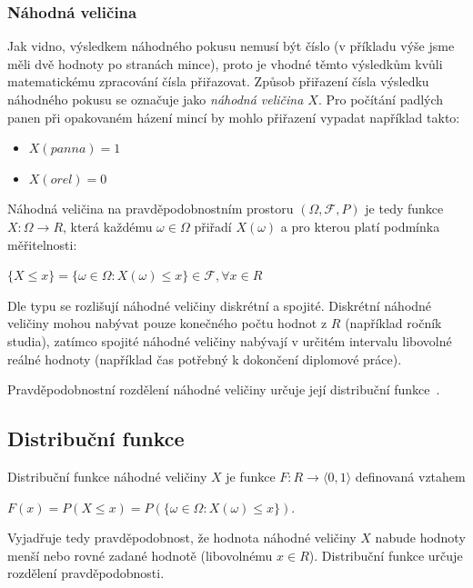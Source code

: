 \documentclass[thesis=M,czech]{FITthesis}[2014/05/07]
\begin{document}
\subsubsection{Náhodná veličina}
Jak vidno, výsledkem náhodného pokusu nemusí být číslo (v příkladu výše jsme měli dvě hodnoty po stranách mince), proto je vhodné těmto výsledkům kvůli matematickému zpracování čísla přiřazovat. Způsob přiřazení čísla výsledku náhodného pokusu se označuje jako \emph{náhodná veličina $X$}. Pro počítání padlých panen při opakovaném házení mincí by mohlo přiřazení vypadat například takto:

\begin{itemize}
	\item $X(panna) = 1$
	\item $X(orel) = 0$
\end{itemize}

Náhodná veličina na pravděpodobnostním prostoru $(\Omega,\mathcal{F},P)$ je tedy funkce $X: \Omega \to R$, která každému $\omega \in \Omega$ přiřadí $X(\omega)$ a pro kterou platí podmínka měřitelnosti:

\begin{center}
$\{ X \leq x \} = \{ \omega \in \Omega: X(\omega) \leq x \} \in \mathcal{F}, \forall x \in R$
\end{center}

Dle typu se rozlišují náhodné veličiny diskrétní a spojité. Diskrétní náhodné veličiny mohou nabývat pouze konečného počtu hodnot z $R$ (například ročník studia), zatímco spojité náhodné veličiny nabývají v určitém intervalu libovolné reálné hodnoty (například čas potřebný k dokončení diplomové práce). 

Pravděpodobnostní rozdělení náhodné veličiny určuje její distribuční funkce~\cite{pst1}. 

\subsection{Distribuční funkce}
Distribuční funkce náhodné veličiny $X$ je funkce $F: R \to \langle0,1\rangle$ definovaná vztahem 

\begin{center}
$F(x) = P(X \leq x) = P(\{ \omega \in \Omega: X(\omega) \leq x \})$.
\end{center}

Vyjadřuje tedy pravděpodobnost, že hodnota náhodné veličiny $X$ nabude hodnoty menší nebo rovné zadané hodnotě (libovolnému $x \in R$). Distribuční funkce určuje rozdělení pravděpodobnosti.
\end{document}
